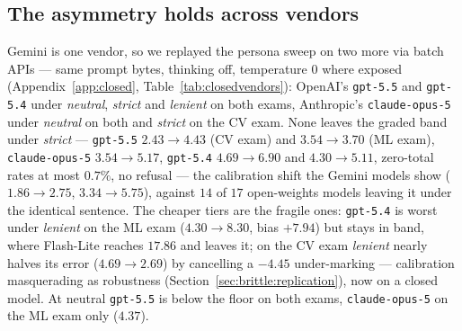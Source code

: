 \subsection{The asymmetry holds across vendors}
\label{sec:closed:vendors}

Gemini is one vendor, so we replayed the persona sweep on two more via batch APIs --- same prompt bytes, thinking off, temperature $0$ where exposed (Appendix~\ref{app:closed}, Table~\ref{tab:closedvendors}): OpenAI's \texttt{gpt-5.5} and \texttt{gpt-5.4} under \emph{neutral}, \emph{strict} and \emph{lenient} on both exams, Anthropic's \texttt{claude-opus-5} under \emph{neutral} on both and \emph{strict} on the CV exam. None leaves the graded band under \emph{strict} --- \texttt{gpt-5.5} $2.43 \to 4.43$ (CV exam) and $3.54 \to 3.70$ (ML exam), \texttt{claude-opus-5} $3.54 \to 5.17$, \texttt{gpt-5.4} $4.69 \to 6.90$ and $4.30 \to 5.11$, zero-total rates at most $0.7\%$, no refusal --- the calibration shift the Gemini models show ($1.86 \to 2.75$, $3.34 \to 5.75$), against $14$ of $17$ open-weights models leaving it under the identical sentence. The cheaper tiers are the fragile ones: \texttt{gpt-5.4} is worst under \emph{lenient} on the ML exam ($4.30 \to 8.30$, bias $+7.94$) but stays in band, where Flash-Lite reaches $17.86$ and leaves it; on the CV exam \emph{lenient} nearly halves its error ($4.69 \to 2.69$) by cancelling a $-4.45$ under-marking --- calibration masquerading as robustness (Section~\ref{sec:brittle:replication}), now on a closed model. At neutral \texttt{gpt-5.5} is below the floor on both exams, \texttt{claude-opus-5} on the ML exam only ($4.37$).
